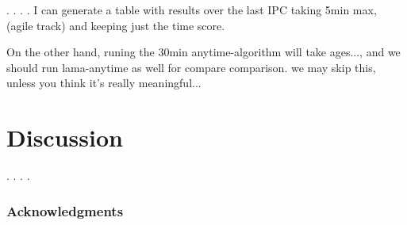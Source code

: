 \documentclass[letterpaper]{article}
\begin{document}
.  .  .  .  I can generate a table with results over the last IPC
taking 5min max, (agile track) and keeping just the time score.

On the other hand, runing the 30min anytime-algorithm will take ages..., and
we should run lama-anytime as well for compare comparison. we may skip this,
unless you think it's really meaningful...

\section{Discussion}
.
.
.
.

\subsubsection{Acknowledgments}




\end{document}

